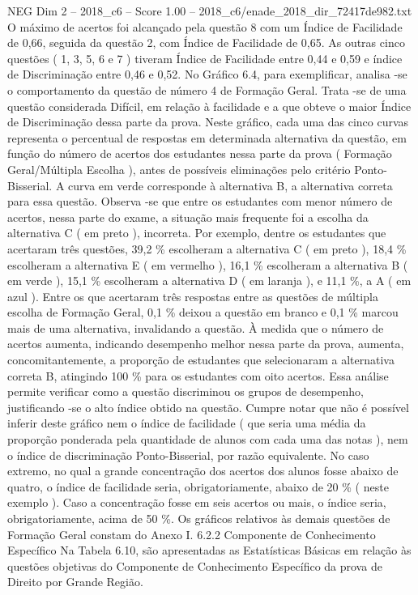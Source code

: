 \begin{textsample}{NEG Dim 2 – 2018\_c6 – Score 1.00 – 2018\_c6/enade\_2018\_dir\_72417de982.txt}
O máximo de acertos foi alcançado pela questão 8 com um Índice de Facilidade de 0,66, seguida da questão 2, com Índice de Facilidade de 0,65.
As outras cinco questões ( 1, 3, 5, 6 e 7 ) tiveram Índice de Facilidade entre 0,44 e 0,59 e índice de Discriminação entre 0,46 e 0,52.
No Gráfico 6.4, para exemplificar, analisa -se o comportamento da questão de número 4 de Formação Geral.
Trata -se de uma questão considerada Difícil, em relação à facilidade e a que obteve o maior Índice de Discriminação dessa parte da prova.
Neste gráfico, cada uma das cinco curvas representa o percentual de respostas em determinada alternativa da questão, em função do número de acertos dos estudantes nessa parte da prova ( Formação Geral/Múltipla Escolha ), antes de possíveis eliminações pelo critério Ponto-Bisserial.
A curva em verde corresponde à alternativa B, a alternativa correta para essa questão.
Observa -se que entre os estudantes com menor número de acertos, nessa parte do exame, a situação mais frequente foi a escolha da alternativa C ( em preto ), incorreta.
Por exemplo, dentre os estudantes que acertaram três questões, 39,2 \% escolheram a alternativa C ( em preto ), 18,4 \% escolheram a alternativa E ( em vermelho ), 16,1 \% escolheram a alternativa B ( em verde ), 15,1 \% escolheram a alternativa D ( em laranja ), e 11,1 \%, a A ( em azul ).
Entre os que acertaram três respostas entre as questões de múltipla escolha de Formação Geral, 0,1 \% deixou a questão em branco e 0,1 \% marcou mais de uma alternativa, invalidando a questão.
À medida que o número de acertos aumenta, indicando desempenho melhor nessa parte da prova, aumenta, concomitantemente, a proporção de estudantes que selecionaram a alternativa correta B, atingindo 100 \% para os estudantes com oito acertos.
Essa análise permite verificar como a questão discriminou os grupos de desempenho, justificando -se o alto índice obtido na questão.
Cumpre notar que não é possível inferir deste gráfico nem o índice de facilidade ( que seria uma média da proporção ponderada pela quantidade de alunos com cada uma das notas ), nem o índice de discriminação Ponto-Bisserial, por razão equivalente.
No caso extremo, no qual a grande concentração dos acertos dos alunos fosse abaixo de quatro, o índice de facilidade seria, obrigatoriamente, abaixo de 20 \% ( neste exemplo ).
Caso a concentração fosse em seis acertos ou mais, o índice seria, obrigatoriamente, acima de 50 \%.
Os gráficos relativos às demais questões de Formação Geral constam do Anexo I. 6.2.2 Componente de Conhecimento Específico Na Tabela 6.10, são apresentadas as Estatísticas Básicas em relação às questões objetivas do Componente de Conhecimento Específico da prova de Direito por Grande Região.

\end{textsample}
